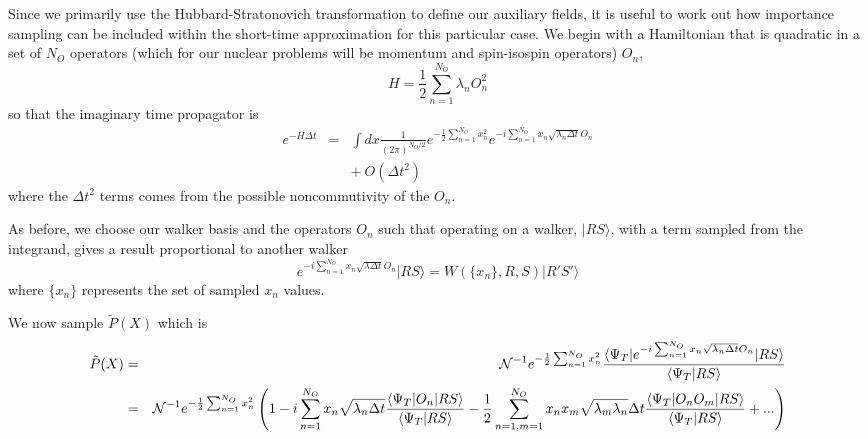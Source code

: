 Since we primarily use the Hubbard-Stratonovich transformation to define
our auxiliary fields, it is useful to work out how importance sampling
can be included within the short-time approximation for this particular
case. We begin with a Hamiltonian that is quadratic in a set of $N_O$ operators
(which for our nuclear problems will be momentum and spin-isospin operators)
$O_n$,
\begin{equation}
\label{eq.sumofsquares}
H = \frac{1}{2}\sum_{n=1}^{N_O} \lambda_n O_n^2
\end{equation}
so that the imaginary time propagator is
\begin{eqnarray}
e^{-H \Delta t} &=&  \int dx \frac{1}{(2\pi)^{N_O/2}}
e^{-\frac{1}{2}\sum_{n=1}^{N_O} x_n^2}
e^{-i\sum_{n=1}^{N_O} x_n \sqrt{\lambda_n \Delta t} O_n}
\nonumber\\
&& + ~ O(\Delta t^2)
\end{eqnarray}
where the $\Delta t^2$ terms comes from the possible noncommutivity of the
$O_n$.

As before, we choose our walker basis and the operators $O_n$ such
that operating on a walker,
$|R S\rangle$,
with a term sampled from the integrand, gives a result
proportional to another walker
\begin{equation}
\label{eq.walkerprop}
e^{-i \sum_{n=1}^{N_O} x_n\sqrt{\lambda \Delta t} O_n}|RS\rangle =
W(\{x_n\},R,S) |R'S'\rangle
\end{equation}
where $\{x_n\}$ represents the set of sampled $x_n$ values.

We now sample $\tilde P(X)$ which is
\begin{eqnarray}
\tilde P(X) &=&
{\cal N}^{-1}
e^{-\frac{1}{2} \sum_{n=1}^{N_O} x_n^2}
\frac{\langle \Psi_T |e^{-i\sum_{n=1}^{N_O}
 x_n \sqrt{\lambda_n \Delta t} O_n}|R S\rangle}
{\langle \Psi_T|RS\rangle}
\nonumber\\
&=& {\cal N}^{-1}
e^{-\frac{1}{2} \sum_{n=1}^{N_O} x_n^2}
\left (1 -i\sum_{n=1}^{N_O} x_n \sqrt{\lambda_n \Delta t}
\frac{\langle \Psi_T|O_n|R S\rangle}
{\langle \Psi_T|R S\rangle}
- \frac{1}{2}\sum_{n=1,m=1}^{N_O}
x_n x_m\sqrt{\lambda_m \lambda_n} \Delta t
\frac{\langle \Psi_T|O_nO_m|R S\rangle}
{\langle \Psi_T|R S\rangle}
+ ... \right )
\nonumber\\
\end{eqnarray}


